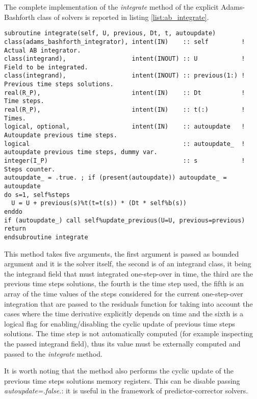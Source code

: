 \documentclass[pdftex,preprint,3p,times,numbers]{elsarticle}
\begin{document}
The complete implementation of the \emph{integrate} method of the explicit Adams-Bashforth class of solvers is reported in listing \ref{list:ab_integrate}.

\begin{lstlisting}[firstnumber=1,style=code,caption={implementation of the \emph{integrate} method of explicit Adams-Bashforth class},label={list:ab_integrate}]
subroutine integrate(self, U, previous, Dt, t, autoupdate)
class(adams_bashforth_integrator), intent(IN)    :: self         ! Actual AB integrator.
class(integrand),                  intent(INOUT) :: U            ! Field to be integrated.
class(integrand),                  intent(INOUT) :: previous(1:) ! Previous time steps solutions.
real(R_P),                         intent(IN)    :: Dt           ! Time steps.
real(R_P),                         intent(IN)    :: t(:)         ! Times.
logical, optional,                 intent(IN)    :: autoupdate   ! Autoupdate previous time steps.
logical                                          :: autoupdate_  ! autoupdate previous time steps, dummy var.
integer(I_P)                                     :: s            ! Steps counter.
autoupdate_ = .true. ; if (present(autoupdate)) autoupdate_ = autoupdate
do s=1, self%steps
  U = U + previous(s)%t(t=t(s)) * (Dt * self%b(s))
enddo
if (autoupdate_) call self%update_previous(U=U, previous=previous)
return
endsubroutine integrate
\end{lstlisting}

This method takes five arguments, the first argument is passed as bounded argument and it is the solver itself, the second is of an integrand class, it being the integrand field that must integrated one-step-over in time, the third are the previous time steps solutions, the fourth is the time step used, the fifth is an array of the time values of the steps considered for the current one-step-over integration that are passed to the residuals function for taking into account the cases where the time derivative explicitly depends on time and the sixth is a logical flag for enabling/disabling the cyclic update of previous time steps solutions. The time step is not automatically computed (for example inspecting the passed integrand field), thus its value must be externally computed and passed to the \emph{integrate} method.

It is worth noting that the method also performs the cyclic update of the previous time steps solutions memory registers. This can be disable passing \emph{autoupdate=.false.}: it is useful in the framework of predictor-corrector solvers.
\end{document}
